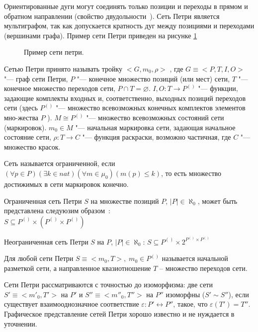 	  Ориентированные дуги могут соединять только позиции и переходы в прямом и обратном направлении (свойство двудольности~\cite{piterson}). Сеть Петри является мультиграфом, так как допускается кратность дуг между позициями и переходами (вершинами графа). Пример сети Петри приведен на рисунке \ref{img:petri-net}
	  
	  	\begin{figure}[h!]
	  		\caption{Пример сети петри.}
	  		\label{img:petri-net}
	  	\end{figure}
	  
	  Сетью Петри принято называть тройку $<G, m_0,\rho>$  , где  $G\equiv<P,T,I,O>$ "--- граф сети Петри, $P$   "--- конечное множество позиций (или мест) сети, $T$ "--- конечное множество переходов сети, $P \cap T = \varnothing$. $I,O:T\rightarrow P^{()}$  "--- функции, задающие комплекты входных и, соответственно, выходных позиций переходов сети (здесь $P^{()}$  "--- множество всевозможных конечных комплектов элементов мно-жества $P$ ). $M \cong P^{()}$ "--- множество всевозможных состояний сети (маркировок).  $m_0 \in M$ "--- начальная маркировка сети, задающая начальное состояние сети, $\rho:T\rightarrow C$ "--- функция раскраски, возможно частичная, где $C$  "--- множество красок.
	  
	  Сеть называется ограниченной, если $ (\forall p \in P) (\exists k \in \textit{nat}) (\forall m \in \mu_0) (m(p) \leq k)$, то есть множество достижимых в сети маркировок конечно.
	  
	Ограниченная сеть Петри $S$ на множестве позиций $P$, $|P|\in \aleph_0$, может быть представлена следуюзим образом~\cite{falkTheory}:\\ 
	$ S \subseteq P^{()} \times (P^{()} \times P^{()}) $
	
	Неограниченная сеть Петри $S$ на  $P$, $|P|\in \aleph_0$:	$ S \subseteq P^{()} \times 2^{P^{()} \times P^{()}} $
	
	Для любой сети Петри $S\equiv < m_0, T >,\;  m_0 \in P^{()}$ называется начальной разметкой сети, а направленное квазиотношение $T$ -- множество переходов сети.
	
	Сети Петри рассматриваются с точностью до изоморфизма: две сети $S'\equiv<{m'}_0, T'>$ на $P'$ и $S''\equiv<{m''}_0, T''>$ на $P''$ изоморфны ($ S' \sim S'' $), если существует взаимооднозначное соответствие $ \varepsilon:P'\leftrightarrow P'' $, такое, что $ \varepsilon(T') = T'' $. Графическое представление сетей Петри хорошо известно и не нуждается в уточнении.
	
